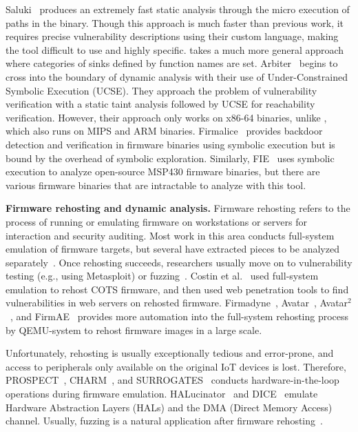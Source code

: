 Saluki~\cite{gotovchits2018saluki} produces an extremely fast static analysis through the micro execution of paths in the binary.
Though this approach is much faster than previous work, it requires precise vulnerability descriptions using their custom language, making the tool difficult to use and highly specific.
\mango takes a much more general approach where categories of sinks defined by function names are set.
Arbiter~\cite{vadayath2022arbiter} begins to cross into the boundary of dynamic analysis with their use of Under-Constrained Symbolic Execution (UCSE).
They approach the problem of vulnerability verification with a static taint analysis followed by UCSE for reachability verification.
However, their approach only works on x86-64 binaries, unlike \mango, which also runs on MIPS and ARM binaries.
Firmalice~\cite{shoshitaishvili2015firmalice} provides backdoor detection and verification in firmware binaries using symbolic execution but is bound by the overhead of symbolic exploration.
Similarly, FIE~\cite{davidson2013fie} uses symbolic execution to analyze open-source MSP430 firmware binaries, but there are various firmware binaries that are intractable to analyze with this tool.

\medskip
\noindent
\textbf{Firmware rehosting and dynamic analysis.}
Firmware rehosting refers to the process of running or emulating firmware on workstations or servers for interaction and security auditing.
Most work in this area conducts full-system emulation of firmware targets, but several have extracted pieces to be analyzed separately~\cite{redini2017bootstomp,costin2014large}.
Once rehosting succeeds, researchers usually move on to vulnerability testing (e.g., using Metasploit) or fuzzing~\cite{chen2018iotfuzzer,ruge2020frankenstein}.
Costin et al.~\cite{costin2014large} used full-system emulation to rehost COTS firmware, and then used web penetration tools to find vulnerabilities in web servers on rehosted firmware.
Firmadyne~\cite{chen2016towards}, Avatar~\cite{zaddach2014avatar}, Avatar$^2$~\cite{muench2018avatar2}, and FirmAE~\cite{kim2020firmae} provides more automation into the full-system rehosting process by QEMU-system to rehost firmware images in a large scale.

Unfortunately, rehosting is usually exceptionally tedious and error-prone, and access to peripherals only available on the original IoT devices is lost.
Therefore, PROSPECT~\cite{kammerstetter2014prospect}, CHARM~\cite{talebi2018charm}, and SURROGATES~\cite{koscher2015surrogates} conducts hardware-in-the-loop operations during firmware emulation.
HALucinator~\cite{clements2020halucinator} and DICE~\cite{mera2021dice} emulate Hardware Abstraction Layers (HALs) and the DMA (Direct Memory Access) channel.
Usually, fuzzing is a natural application after firmware rehosting~\cite{zheng2019firm,zheng2022efficient,srivastava2019firmfuzz,feng2021snipuzz}.


